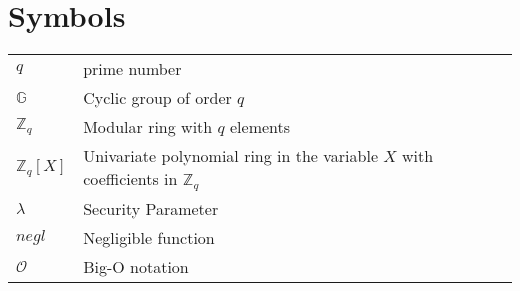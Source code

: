 \documentclass[master=mcs]{kulemt}
\begin{document}
\section*{Symbols}
\begin{flushleft}
  \renewcommand{\arraystretch}{1.1}
  \begin{tabularx}{\textwidth}{@{}p{12mm}X@{}}
    $q$ & prime number \\
    $\mathbb{G}$   & Cyclic group of order $q$ \\
    $\mathbb{Z}_q$   & Modular ring with $q$ elements \\
    $\mathbb{Z}_q[X]$  & Univariate polynomial ring in the variable $X$ with coefficients in $\mathbb{Z}_q$ \\
    $\lambda$   & Security Parameter \\
    $negl$ & Negligible function \\
    $\mathcal{O}$ & Big-O notation \\
  \end{tabularx}
\end{flushleft}

\mainmatter







\appendixpage*          %
\appendix



\backmatter


\end{document}
